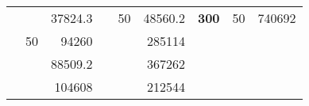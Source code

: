 \begin{table}[H]
\begin{tabular}{|ccrccrccc}
\rowcolor[HTML]{DDFDFF} 
\multicolumn{1}{|c|}{\cellcolor[HTML]{FFFFC7}}                                & \multicolumn{1}{c|}{\cellcolor[HTML]{DDFDFF}}                      & \multicolumn{1}{r|}{\cellcolor[HTML]{DAE8FC}37824.3}   & \multicolumn{1}{c|}{\cellcolor[HTML]{FFFFC7}}                                & \multicolumn{1}{c|}{\multirow{-10}{*}{\cellcolor[HTML]{DDFDFF}50}}  & \multicolumn{1}{r|}{\cellcolor[HTML]{DDFDFF}48560.2}   & \multicolumn{1}{c|}{\multirow{-19}{*}{\cellcolor[HTML]{FFFFC7}\textbf{300}}} & \multicolumn{1}{c|}{\multirow{-10}{*}{\cellcolor[HTML]{DDFDFF}50}} & \multicolumn{1}{r|}{\cellcolor[HTML]{DDFDFF}740692}    \\ \cline{3-3} \cline{5-9} 
\multicolumn{1}{|c|}{\cellcolor[HTML]{FFFFC7}}                                & \multicolumn{1}{c|}{\multirow{-10}{*}{\cellcolor[HTML]{DDFDFF}50}} & \multicolumn{1}{r|}{\cellcolor[HTML]{DDFDFF}94260}     & \multicolumn{1}{c|}{\cellcolor[HTML]{FFFFC7}}                                & \multicolumn{1}{c|}{\cellcolor[HTML]{DAE8FC}}                       & \multicolumn{1}{r|}{\cellcolor[HTML]{DAE8FC}285114}    &                                                                              &                                                                    &                                                        \\ \cline{2-3} \cline{6-6}
\multicolumn{1}{|c|}{\cellcolor[HTML]{FFFFC7}}                                & \multicolumn{1}{c|}{\cellcolor[HTML]{DAE8FC}}                      & \multicolumn{1}{r|}{\cellcolor[HTML]{DAE8FC}88509.2}   & \multicolumn{1}{c|}{\cellcolor[HTML]{FFFFC7}}                                & \multicolumn{1}{c|}{\cellcolor[HTML]{DAE8FC}}                       & \multicolumn{1}{r|}{\cellcolor[HTML]{DDFDFF}367262}    &                                                                              &                                                                    &                                                        \\ \cline{3-3} \cline{6-6}
\multicolumn{1}{|c|}{\cellcolor[HTML]{FFFFC7}}                                & \multicolumn{1}{c|}{\cellcolor[HTML]{DAE8FC}}                      & \multicolumn{1}{r|}{\cellcolor[HTML]{DDFDFF}104608}    & \multicolumn{1}{c|}{\cellcolor[HTML]{FFFFC7}}                                & \multicolumn{1}{c|}{\cellcolor[HTML]{DAE8FC}}                       & \multicolumn{1}{r|}{\cellcolor[HTML]{DAE8FC}212544}    &                                                                              &                                                                    &                                                        \\ \cline{3-3} \cline{6-6}

\end{tabular}
\end{table}

